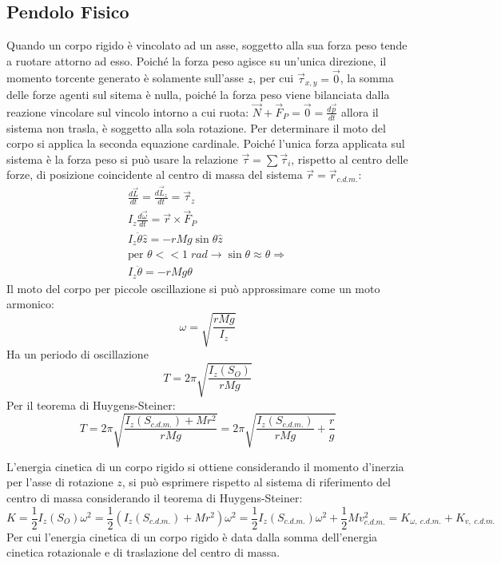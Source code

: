 \documentclass{article}
\numberwithin{equation}{subsection}
\begin{document}
\subsection{Pendolo Fisico}
Quando un corpo rigido è vincolato ad un asse, soggetto 
alla sua forza peso tende a ruotare attorno ad esso. 
Poiché la forza peso agisce su un'unica direzione, il momento torcente generato è solamente sull'asse $z$, per cui $\vec{\tau}_{x,y}=\vec{0}$, 
la somma delle forze agenti sul sitema è nulla, poiché 
la forza peso viene bilanciata dalla reazione vincolare sul vincolo intorno a cui ruota: $\vec{N}+\vec{F}_P=\vec{0}=\displaystyle\frac{d\vec{p}}{dt}$ 
allora il sistema non trasla, è soggetto alla sola rotazione. 
Per determinare il moto del corpo si applica la seconda 
equazione cardinale. Poiché l'unica forza applicata sul sistema è la forza peso si può usare la relazione $\vec{\tau}=\sum\vec{\tau}_i$, rispetto al 
centro delle forze, di posizione coincidente al centro di massa del sistema $\vec{r}=\vec{r}_{c.d.m.}$:
\begin{gather*}
    \displaystyle\frac{d\vec{L}}{dt}=\frac{d\vec{L}_z}{dt}=\vec{\tau}_z\\
    I_z\displaystyle\frac{d\vec{\omega}}{dt}=\vec{r}\times\vec{F}_P\\
    I_z\ddot\theta\hat{z}=-rMg\sin\theta\hat{z}\\
    \mbox{per }\theta<<1\;rad\rightarrow \sin\theta\approx\theta\Rightarrow\\
    I_z\ddot\theta=-rMg\theta
\end{gather*}
Il moto del corpo per piccole oscillazione si può approssimare come un moto armonico: 
\begin{equation}
    \omega=\displaystyle\sqrt{\displaystyle\frac{rMg}{I_z}}
\end{equation}
Ha un periodo di oscillazione 
\begin{equation*}
    T=2\pi\displaystyle\sqrt{\frac{I_z(S_O)}{rMg}}
\end{equation*}
Per il teorema di Huygens-Steiner: 
\begin{equation}
    T=2\pi\sqrt{\frac{I_z(S_{c.d.m.})+Mr^2}{rMg}}=2\pi\sqrt{\frac{I_z(S_{c.d.m.})}{rMg}+\frac{r}{g}}
\end{equation}


L'energia cinetica di un corpo rigido si ottiene considerando il momento d'inerzia per l'asse di rotazione $z$, si può esprimere rispetto al sistema di riferimento 
del centro di massa considerando il teorema di Huygens-Steiner:
\begin{equation*}
    K=\displaystyle\frac{1}{2}I_z(S_O)\omega^2=\frac{1}{2}(I_z(S_{c.d.m.})+Mr^2)\omega^2=\frac{1}{2}I_z(S_{c.d.m.})\omega^2+\frac{1}{2}Mv_{c.d.m.}^2=K_{\omega,\:c.d.m.}+K_{v,\:c.d.m.}
\end{equation*}
Per cui l'energia cinetica di un corpo rigido è data dalla somma dell'energia cinetica rotazionale e di traslazione del centro di massa. 
\end{document}
